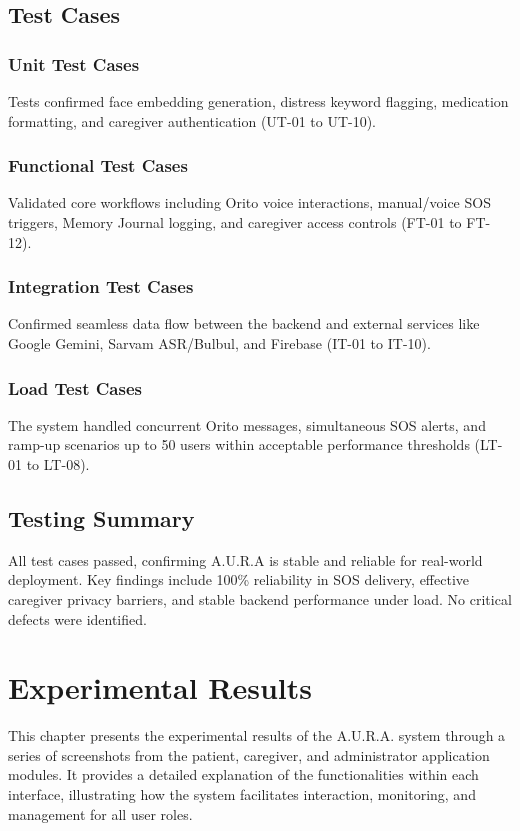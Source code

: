 \section{Test Cases}
\subsection{Unit Test Cases}
Tests confirmed face embedding generation, distress keyword flagging, medication formatting, and caregiver authentication (UT-01 to UT-10).

\subsection{Functional Test Cases}
Validated core workflows including Orito voice interactions, manual/voice SOS triggers, Memory Journal logging, and caregiver access controls (FT-01 to FT-12).

\subsection{Integration Test Cases}
Confirmed seamless data flow between the backend and external services like Google Gemini, Sarvam ASR/Bulbul, and Firebase (IT-01 to IT-10).

\subsection{Load Test Cases}
The system handled concurrent Orito messages, simultaneous SOS alerts, and ramp-up scenarios up to 50 users within acceptable performance thresholds (LT-01 to LT-08).

\section{Testing Summary}
All test cases passed, confirming A.U.R.A is stable and reliable for real-world deployment. Key findings include 100\% reliability in SOS delivery, effective caregiver privacy barriers, and stable backend performance under load. No critical defects were identified.

\chapter{Experimental Results}
This chapter presents the experimental results of the A.U.R.A. system through a series of screenshots from the patient, caregiver, and administrator application modules. It provides a detailed explanation of the functionalities within each interface, illustrating how the system facilitates interaction, monitoring, and management for all user roles.

